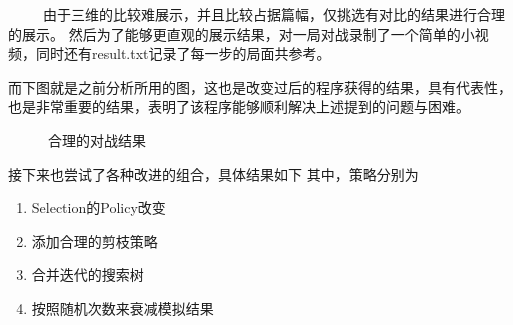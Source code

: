\documentclass[9pt,twocolumn,twoside]{osajnl}
\begin{document}
\begin{adjustwidth}{2em}{}	
	\ \ \ \ \
由于三维的比较难展示，并且比较占据篇幅，仅挑选有对比的结果进行合理的展示。
然后为了能够更直观的展示结果，对一局对战录制了一个简单的小视频，同时还有result.txt记录了每一步的局面共参考。

而下图就是之前分析所用的图，这也是改变过后的程序获得的结果，具有代表性，也是非常重要的结果，表明了该程序能够顺利解决上述提到的问题与困难。
\begin{figure}[htbp]
	\centering
	\caption{合理的对战结果}
	\label{result}
\end{figure}	

接下来也尝试了各种改进的组合，具体结果如下
其中，策略分别为
\begin{enumerate}
	\item Selection的Policy改变
	\item 添加合理的剪枝策略
	\item 合并迭代的搜索树
	\item 按照随机次数来衰减模拟结果
\end{enumerate}


\end{adjustwidth}
\end{document}

